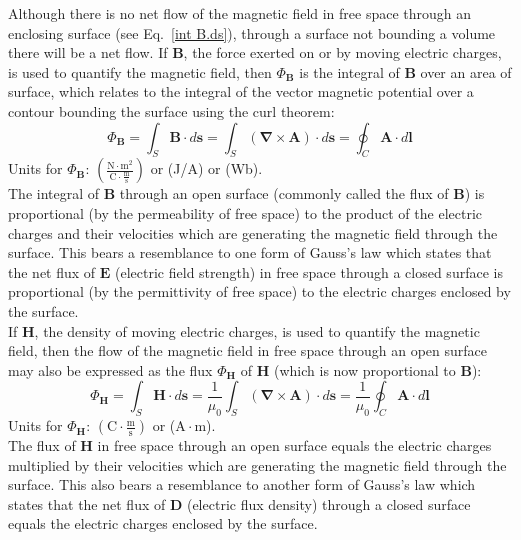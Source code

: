 Although there is no net flow of the magnetic field in free space through an enclosing surface (see Eq.~\ref{int B.ds}), through a surface not bounding a volume there will be a net flow.  If $\mathbf{B}$, the force exerted on or by moving electric charges, is used to quantify the magnetic field, then  $\Phi_{\mathbf{B}}$ is the integral of $\mathbf{B}$ over an area of surface, which relates to the integral of the vector magnetic potential over a contour bounding the surface using the curl theorem:
\begin{equation}\label{Phi B}
\Phi_{\mathbf{B}} = \int_S \mathbf{B} \cdot d\mathbf{s} = \int_S (\mathbf{\nabla} \times \mathbf{A}) \cdot d\mathbf{s} = \oint_C \mathbf{A} \cdot d\mathbf{l}
\end{equation}
{\noindent}Units for $\Phi_{\mathbf{B}}$: $\left( \frac{\mathrm{N} \cdot \mathrm{m^2}}{\mathrm{C} \cdot \frac{\mathrm{m}}{\mathrm{s}}} \right)$ or (J/A) or (Wb).\\
The integral of $\mathbf{B}$ through an open surface (commonly called the flux of $\mathbf{B}$) is proportional (by the permeability of free space) to the product of the electric charges and their velocities which are generating the magnetic field through the surface.  This bears a resemblance to one form of Gauss's law which states that the net flux of $\mathbf{E}$ (electric field strength) in free space through a closed surface is proportional (by the permittivity of free space) to the electric charges enclosed by the surface.\\

If $\mathbf{H}$, the density of moving electric charges, is used to quantify the magnetic field, then the flow of the magnetic field in free space through an open surface may also be expressed as the flux $\Phi_{\mathbf{H}}$ of $\mathbf{H}$ (which is now proportional to $\mathbf{B}$):
\begin{equation}\label{H flux}
\Phi_{\mathbf{H}} = \int_S \mathbf{H} \cdot d\mathbf{s} = \frac{1}{\mu_0} \int_S (\mathbf{\nabla} \times \mathbf{A}) \cdot d\mathbf{s} = \frac{1}{\mu_0} \oint_C \mathbf{A} \cdot d\mathbf{l}
\end{equation}
{\noindent}Units for $\Phi_{\mathbf{H}}$: $\left( \mathrm{C} \cdot \frac{\mathrm{m}}{\mathrm{s}}\right)$ or ($\mathrm{A} \cdot \mathrm{m}$).\\
The flux of $\mathbf{H}$ in free space through an open surface equals the electric charges multiplied by their velocities which are generating the magnetic field through the surface.  This also bears a resemblance to another form of Gauss's law which states that the net flux of $\mathbf{D}$ (electric flux density) through a closed surface equals the electric charges enclosed by the surface.\\


